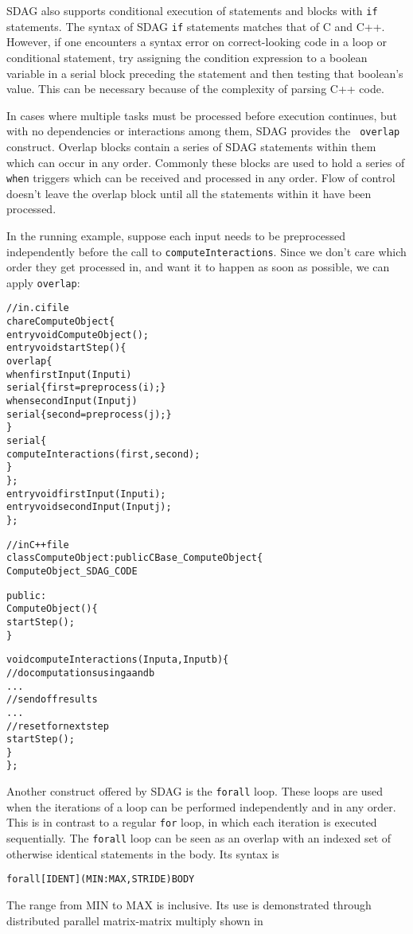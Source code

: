 SDAG also supports conditional execution of statements and blocks with {\tt if}
statements. The syntax of SDAG {\tt if} statements matches that of C and
C++. However, if one encounters a syntax error on correct-looking code in a
loop or conditional statement, try assigning the condition expression to a
boolean variable in a serial block preceding the statement and then testing that
boolean's value. This can be necessary because of the complexity of parsing C++
code.

In cases where multiple tasks must be processed before execution continues, but
with no dependencies or interactions among them, SDAG provides the {\tt
  overlap} construct. Overlap blocks contain a series of SDAG statements within
them which can occur in any order. Commonly these blocks are used to hold a
series of {\tt when} triggers which can be received and processed in any
order. Flow of control doesn't leave the overlap block until all the statements
within it have been processed.

In the running example, suppose each input needs to be preprocessed independently
before the call to {\tt computeInteractions}. Since we don't care which order
they get processed in, and want it to happen as soon as possible, we can apply
{\tt overlap}:
\begin{center}
\begin{alltt}
// in .ci file
chare ComputeObject \{
  entry void ComputeObject();
  entry void startStep() \{
    overlap \{
      when firstInput(Input i)
        serial \{ first = preprocess(i); \}
      when secondInput(Input j)
        serial \{ second = preprocess(j); \}
     \}
     serial \{
       computeInteractions(first, second);
     \}
  \};
  entry void firstInput(Input i);
  entry void secondInput(Input j);
\};

// in C++ file
class ComputeObject : public CBase_ComputeObject \{
  ComputeObject_SDAG_CODE

public:
  ComputeObject() \{
    startStep();
  \}

  void computeInteractions(Input a, Input b) \{
    // do computations using a and b
    . . .
    // send off results
    . . .
    // reset for next step
    startStep();
  \}
\};
\end{alltt}
\end{center}

Another construct offered by SDAG is the {\tt forall} loop. These loops are
used when the iterations of a loop can be performed independently and in any
order. This is in contrast to a regular {\tt for} loop, in which each iteration
is executed sequentially. The {\tt forall} loop can be seen as an overlap with
an indexed set of otherwise identical statements in the body. Its syntax is 
\begin{center}
\begin{alltt}
forall [IDENT] (MIN:MAX,STRIDE) BODY
\end{alltt}
\end{center}
The range from MIN to MAX is inclusive. Its use is demonstrated through
distributed parallel matrix-matrix multiply shown in

